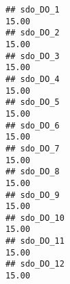 \documentclass[
]{article}
\begin{document}
\begin{verbatim}
## sdo_DO_1                                                                                                                                                                                                                      15.00
## sdo_DO_2                                                                                                                                                                                                                      15.00
## sdo_DO_3                                                                                                                                                                                                                      15.00
## sdo_DO_4                                                                                                                                                                                                                      15.00
## sdo_DO_5                                                                                                                                                                                                                      15.00
## sdo_DO_6                                                                                                                                                                                                                      15.00
## sdo_DO_7                                                                                                                                                                                                                      15.00
## sdo_DO_8                                                                                                                                                                                                                      15.00
## sdo_DO_9                                                                                                                                                                                                                      15.00
## sdo_DO_10                                                                                                                                                                                                                     15.00
## sdo_DO_11                                                                                                                                                                                                                     15.00
## sdo_DO_12                                                                                                                                                                                                                     15.00

\end{verbatim}
\end{document}
